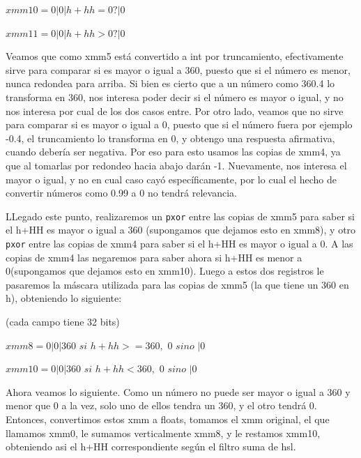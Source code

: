 \documentclass[a4paper]{article}
\begin{document}
$xmm10= 0 | 0 | h+hh = 0? | 0$

\vspace*{0.3cm}

$xmm11= 0 | 0 | h+hh > 0? | 0$

\vspace*{0.3cm}

Veamos que como xmm5 está convertido a int por truncamiento, efectivamente sirve para comparar si es mayor o igual a 360, puesto que si el número es menor, nunca redondea para arriba. Si bien es cierto que a un número como 360.4 lo transforma en 360, nos interesa poder decir si el número es mayor o igual, y no nos interesa por cual de los dos casos entre. Por otro lado, veamos que no sirve para comparar si es mayor o igual a 0, puesto que si el número fuera por ejemplo -0.4, el truncamiento lo transforma en 0, y obtengo una respuesta afirmativa, cuando debería ser negativa. Por eso para esto usamos las copias de xmm4, ya que al tomarlas por redondeo hacia abajo darán -1. Nuevamente, nos interesa el mayor o igual, y no en cual caso cayó específicamente, por lo cual el hecho de convertir números como 0.99 a 0 no tendrá relevancia.

LLegado este punto, realizaremos un {\tt pxor} entre las copias de xmm5 para saber si el h+HH es mayor o igual a 360 (supongamos que dejamos esto en xmm8), y otro {\tt pxor} entre las copias de xmm4 para saber si el h+HH es mayor o igual a 0. A las copias de xmm4 las negaremos para saber ahora si h+HH es menor a 0(supongamos que dejamos esto en xmm10). Luego a estos dos registros le pasaremos la máscara utilizada para las copias de xmm5 (la que tiene un 360 en h), obteniendo lo siguiente:

\vspace*{0.3cm}

(cada campo tiene 32 bits)

\vspace*{0.3cm}

$xmm8= 0 | 0 | 360$ $si$ $h+hh>=360,$ $0$ $sino$ $| 0$

\vspace*{0.3cm}

$xmm10=0 | 0 | 360$ $si$ $h+hh<360,$ $0$ $sino$ $| 0$

\vspace*{0.3cm}

Ahora veamos lo siguiente. Como un número no puede ser mayor o igual a 360 y menor que 0 a la vez, solo uno de ellos tendra un 360, y el otro tendrá 0. Entonces, convertimos estos xmm a floats, tomamos el xmm original, el que llamamos xmm0, le sumamos verticalmente xmm8, y le restamos xmm10, obteniendo asi el h+HH correspondiente según el filtro suma de hsl.
\end{document}
